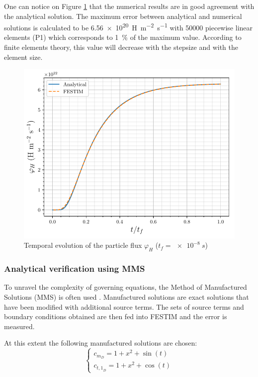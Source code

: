 One can notice on Figure \ref{fig:FESTIM vs analytical} that the numerical results are in good agreement with the analytical solution.
The maximum error between analytical and numerical solutions is calculated to be \SI{6.56e20}{H.m^{-2}.s^{-1}} with 50000 piecewise linear elements (P1) which corresponds to \SI{1}{\%} of the maximum value.
According to finite elements theory, this value will decrease with the stepsize and with the element size.
\begin{figure}
    \centering
    \includegraphics[width=\linewidth]{Figures/Chapter3/FESTIM_vs_analytical.pdf}
    \caption{Temporal evolution of the particle flux $\varphi_H$ ($t_f = \SI{e-8}{s}$)}
    \label{fig:FESTIM vs analytical}
\end{figure}
\subsubsection{Analytical verification using MMS} \label{mms}

To unravel the complexity of governing equations, the Method of Manufactured Solutions (MMS) is often used .
Manufactured solutions are exact solutions that have been modified with additional source terms.
The sets of source terms and boundary conditions obtained are then fed into FESTIM and the error is measured.


At this extent the following manufactured solutions are chosen:
\begin{equation}
    \begin{cases}
    c_{m_D} = 1 + x^2 + \sin(t) \\
    c_{{t,1}_D} = 1 + x^2 + \cos(t)
    \end{cases}
    \label{eq: manufactured solutions}
\end{equation}

